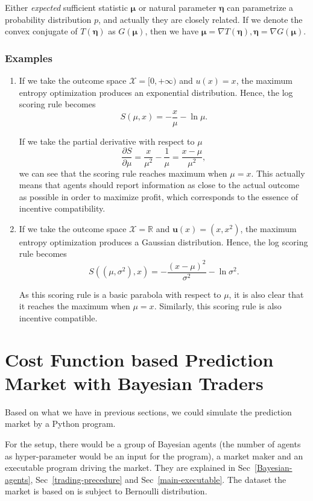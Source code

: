 \documentclass[12pt]{article}
\begin{document}
Either \textit{expected} sufficient statistic $\bm{\mu}$ or natural parameter $\bm{\eta}$ can parametrize a probability distribution $p$, and actually they are closely related. If we denote the convex conjugate of $T(\bm{\eta})$ as $G(\bm{\mu})$, then we have $\bm{\mu}=\nabla T(\bm{\eta}),\bm{\eta}=\nabla G(\bm{\mu})$.
\subsubsection{Examples}
\begin{enumerate}
    \item If we take the outcome space $\mathcal{X}=[0,+\infty)$ and $u(x)=x$, the maximum entropy optimization produces an exponential distribution. Hence, the log scoring rule becomes
          \[S(\mu,x)=-\frac{x}{\mu}-\ln\mu.\]

          If we take the partial derivative with respect to $\mu$
          \[\frac{\partial S}{\partial\mu}=\frac{x}{\mu^2}-\frac{1}{\mu}=\frac{x-\mu}{\mu^2},\]
          we can see that the scoring rule reaches maximum when $\mu=x$. This actually means that agents should report information as close to the actual outcome as possible in order to maximize profit, which corresponds to the essence of incentive compatibility.
    \item If we take the outcome space $\mathcal{X}=\mathbb{R}$ and $\mathbf{u}(x)=(x,x^2)$, the maximum entropy optimization produces a Gaussian distribution. Hence, the log scoring rule becomes
          \[S((\mu,\sigma^2),x)=-\frac{(x-\mu)^2}{\sigma^2}-\ln\sigma^2.\]

          As this scoring rule is a basic parabola with respect to $\mu$, it is also clear that it reaches the maximum when $\mu=x$. Similarly, this scoring rule is also incentive compatible.
\end{enumerate}

\section{Cost Function based Prediction Market with Bayesian Traders}
Based on what we have in previous sections, we could simulate the prediction market by a Python program.

For the setup, there would be a group of Bayesian agents (the number of agents as hyper-parameter would be an input for the program), a market maker and an executable program driving the market. They are explained in Sec~\ref{Bayesian-agents}, Sec~\ref{trading-precedure} and Sec~\ref{main-executable}. The dataset the market is based on is subject to Bernoulli distribution.
\end{document}
